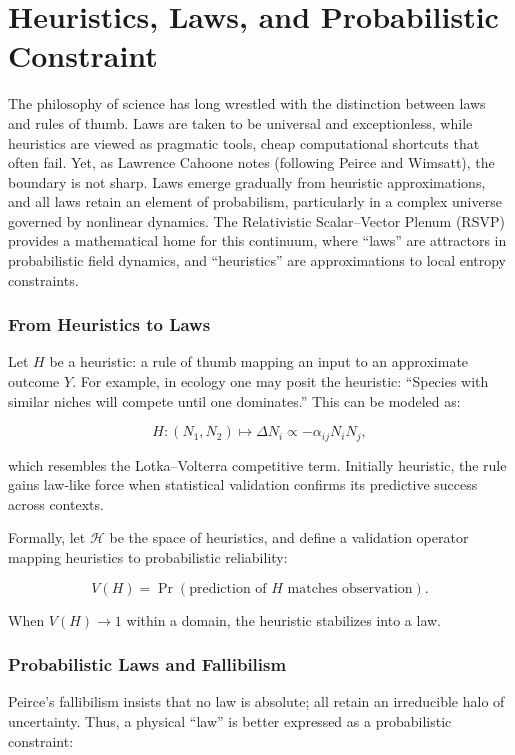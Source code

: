 \documentclass[12pt]{book}
\begin{document}
\chapter{Heuristics, Laws, and Probabilistic Constraint}
The philosophy of science has long wrestled with the distinction between laws and rules of thumb. Laws are taken to be universal and exceptionless, while heuristics are viewed as pragmatic tools, cheap computational shortcuts that often fail. Yet, as Lawrence Cahoone notes (following Peirce and Wimsatt), the boundary is not sharp. Laws emerge gradually from heuristic approximations, and all laws retain an element of probabilism, particularly in a complex universe governed by nonlinear dynamics. The Relativistic Scalar–Vector Plenum (RSVP) provides a mathematical home for this continuum, where “laws” are attractors in probabilistic field dynamics, and “heuristics” are approximations to local entropy constraints.

\subsection{From Heuristics to Laws}
Let \( H \) be a heuristic: a rule of thumb mapping an input to an approximate outcome \( Y \). For example, in ecology one may posit the heuristic: “Species with similar niches will compete until one dominates.” This can be modeled as:

\[ H: (N_1, N_2) \mapsto \Delta N_i \propto -\alpha_{ij} N_i N_j, \]

which resembles the Lotka–Volterra competitive term. Initially heuristic, the rule gains law-like force when statistical validation confirms its predictive success across contexts.

Formally, let \( \mathcal{H} \) be the space of heuristics, and define a validation operator mapping heuristics to probabilistic reliability:

\[ V(H) = \Pr(\text{prediction of } H \text{ matches observation}). \]

When \( V(H) \to 1 \) within a domain, the heuristic stabilizes into a law.

\subsection{Probabilistic Laws and Fallibilism}
Peirce’s fallibilism insists that no law is absolute; all retain an irreducible halo of uncertainty. Thus, a physical “law” is better expressed as a probabilistic constraint:
\end{document}
